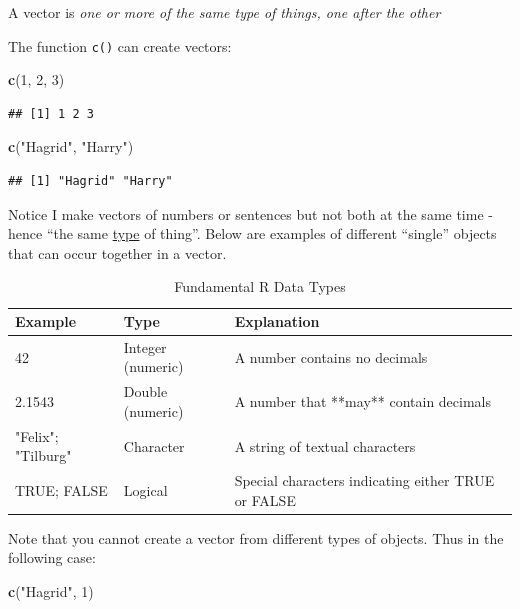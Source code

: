 \documentclass[
]{book}
\newenvironment{Shaded}{\begin{snugshade}}{\end{snugshade}}
\newcommand{\DecValTok}[1]{\textcolor[rgb]{0.00,0.00,0.81}{#1}}
\newcommand{\FunctionTok}[1]{\textcolor[rgb]{0.13,0.29,0.53}{\textbf{#1}}}
\newcommand{\NormalTok}[1]{#1}
\newcommand{\StringTok}[1]{\textcolor[rgb]{0.31,0.60,0.02}{#1}}
\begin{document}
A vector is \emph{one or more of the same type of things, one after the other}

The function \texttt{c()} can create vectors:

\begin{Shaded}
\begin{Highlighting}[]
\FunctionTok{c}\NormalTok{(}\DecValTok{1}\NormalTok{, }\DecValTok{2}\NormalTok{, }\DecValTok{3}\NormalTok{)}
\end{Highlighting}
\end{Shaded}

\begin{verbatim}
## [1] 1 2 3
\end{verbatim}

\begin{Shaded}
\begin{Highlighting}[]
\FunctionTok{c}\NormalTok{(}\StringTok{"Hagrid"}\NormalTok{, }\StringTok{"Harry"}\NormalTok{)}
\end{Highlighting}
\end{Shaded}

\begin{verbatim}
## [1] "Hagrid" "Harry"
\end{verbatim}

Notice I make vectors of numbers or sentences but not both at the same time - hence ``the same \ul{type} of thing''. Below are examples of different ``single'' objects that can occur together in a vector.

\begin{table}

\caption{\label{tab:data-types}Fundamental R Data Types}
\centering
\begin{tabular}[t]{lll}
\toprule
Example & Type & Explanation\\
\midrule
42 & Integer (numeric) & A number contains no decimals\\
2.1543 & Double (numeric) & A number that **may** contain decimals\\
"Felix"; "Tilburg" & Character & A string of textual characters\\
TRUE; FALSE & Logical & Special characters indicating either TRUE or FALSE\\
\bottomrule
\end{tabular}
\end{table}

Note that you cannot create a vector from different types of objects. Thus in the following case:

\begin{Shaded}
\begin{Highlighting}[]
\FunctionTok{c}\NormalTok{(}\StringTok{"Hagrid"}\NormalTok{, }\DecValTok{1}\NormalTok{)}
\end{Highlighting}
\end{Shaded}
\end{document}
